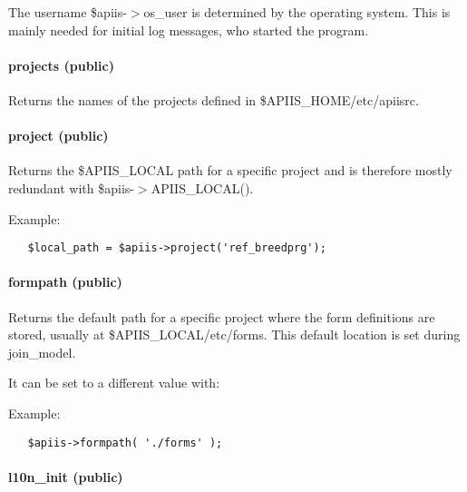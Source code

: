 The username \$apiis-$>$os\_user is determined by the operating system. This is
mainly needed for initial log messages, who started the program.

\paragraph*{projects (public)\label{Apiis::Init_--_Basic_initialisation_object_for_the_complete_APIIS_structure_projects_public_}}


Returns the names of the projects defined in \$APIIS\_HOME/etc/apiisrc.

\paragraph*{project (public)\label{Apiis::Init_--_Basic_initialisation_object_for_the_complete_APIIS_structure_project_public_}}


Returns the \$APIIS\_LOCAL path for a specific project and is therefore mostly
redundant with \$apiis-$>$APIIS\_LOCAL().



Example:

\begin{verbatim}
   $local_path = $apiis->project('ref_breedprg');
\end{verbatim}
\paragraph*{formpath (public)\label{Apiis::Init_--_Basic_initialisation_object_for_the_complete_APIIS_structure_formpath_public_}}


Returns the default path for a specific project where the form definitions are
stored, usually at \$APIIS\_LOCAL/etc/forms. This default location is set during
join\_model.



It can be set to a different value with:



Example:

\begin{verbatim}
   $apiis->formpath( './forms' );
\end{verbatim}
\paragraph*{l10n\_init (public)\label{Apiis::Init_--_Basic_initialisation_object_for_the_complete_APIIS_structure_l10n_init_public_}}


